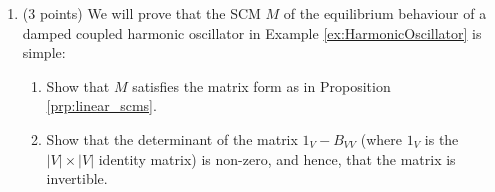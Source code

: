 \begin{enumerate}
\begin{gradedsolution}
\begin{enumerate}
\begin{center}
		\end{center}
		\item This follows from the series of equivalences between $f$ and $\tilde{f}$ in the proof of Proposition \ref*{prp:scm_acyclification_properties}. Check this!
		\item E.g. intervene $X_A=x_a$. Then in $M$, $B$ is affected by $x_a$, but in $M^{\text{acy}}$, it is not.
		\item The first two are false. The third is true.
	\end{enumerate}
\end{gradedsolution}

\item ($3$ points) We will prove that the SCM $M$ of the equilibrium behaviour of a damped coupled harmonic oscillator in Example \ref*{ex:HarmonicOscillator} is simple:

\begin{enumerate}
	\item Show that $M$ satisfies the matrix form as in Proposition \ref*{prp:linear_scms}.
	\item \label{eq:tridiag} Show that the determinant of the matrix $1_{V}-B_{VV}$ (where $1_V$ is the $|V|\times |V|$ identity matrix) is non-zero, and hence, that the matrix is invertible.


\end{enumerate}
\end{enumerate}
